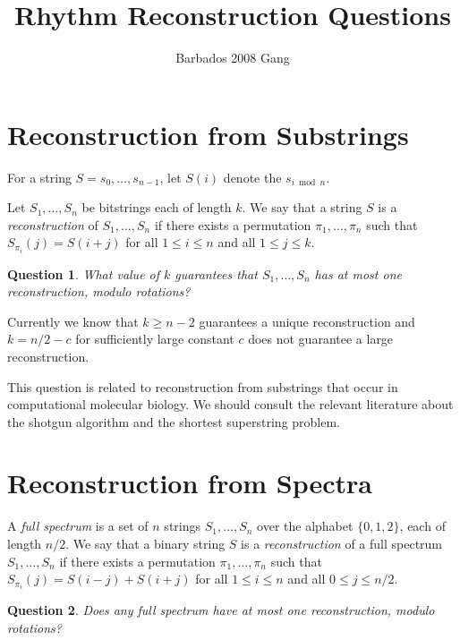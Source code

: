 \documentclass[12pt]{article}
\title{Rhythm Reconstruction Questions}
\author{Barbados 2008 Gang}
\newtheorem{question}{Question}
\begin{document}
\maketitle

\section{Reconstruction from Substrings}

For a string $S=s_0,\ldots,s_{n-1}$, let $S(i)$ denote the $s_{i\bmod
n}$.

Let $S_1,\ldots,S_n$ be bitstrings each of length $k$.  We say that a
string $S$ is a \emph{reconstruction} of $S_1,\ldots,S_n$ if there
exists a permutation $\pi_1,\ldots,\pi_n$ such that
$S_{\pi_i}(j)=S(i+j)$ for all $1\le i\le n$ and all $1\le j\le k$.

\begin{question}
What value of $k$ guarantees that $S_1,\ldots,S_n$ has at most one
reconstruction, modulo rotations?
\end{question}

Currently we know that $k\ge n-2$ guarantees a unique reconstruction
and $k=n/2-c$ for sufficiently large constant $c$ does not guarantee a
large reconstruction.

This question is related to reconstruction from substrings that occur
in computational molecular biology.  We should consult the relevant
literature about the shotgun algorithm and the shortest superstring
problem. 


\section{Reconstruction from Spectra}

A \emph{full spectrum} is a set of $n$ strings $S_1,\ldots,S_n$ over
the alphabet $\{0,1,2\}$, each of length $n/2$.  We say that a binary
string $S$ is a \emph{reconstruction} of a full spectrum
$S_1,\ldots,S_n$ if there exists a permutation $\pi_1,\ldots,\pi_n$
such that $S_{\pi_i}(j) = S(i-j) + S(i+j)$ for all $1\le i\le n$ and
all $0\le j\le n/2$.

\begin{question}
Does any full spectrum have at most one reconstruction, modulo
rotations?
\end{question}
\end{document}
